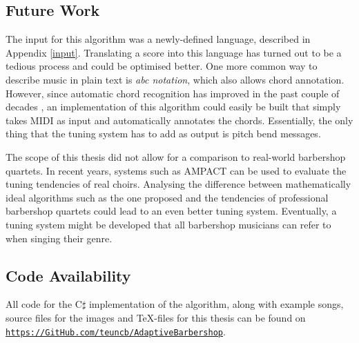\documentclass[a4paper]{article}
\begin{document}
\subsection{Future Work}
The input for this algorithm was a newly-defined language, described in Appendix \ref{input}. Translating a score into this language has turned out to be a tedious process and could be optimised better. One more common way to describe music in plain text is \textit{abc notation}, which also allows chord annotation. \cite{walshaw_abc2mtex_1997} However, since automatic chord recognition has improved in the past couple of decades \cite{burgoyne_cross-validated_2007}, an implementation of this algorithm could easily be built that simply takes MIDI as input and automatically annotates the chords. Essentially, the only thing that the tuning system has to add as output is pitch bend messages.

The scope of this thesis did not allow for a comparison to real-world barbershop quartets. In recent years, systems such as AMPACT can be used to evaluate the tuning tendencies of real choirs. \cite{devaney_study_2012} Analysing the difference between mathematically ideal algorithms such as the one proposed and the tendencies of professional barbershop quartets could lead to an even better tuning system. Eventually, a tuning system might be developed that all barbershop musicians can refer to when singing their genre.

\subsection{Code Availability}
All code for the C$\sharp$ implementation of the algorithm, along with example songs, source files for the images and \TeX-files for this thesis can be found on \texttt{\url{https://GitHub.com/teuncb/AdaptiveBarbershop}}.


\end{document}
